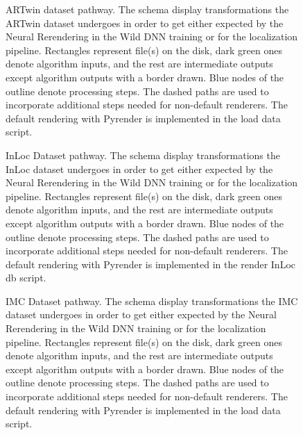 \begin{figure}
    \centering
    
    \caption{ARTwin dataset pathway. The
    schema display transformations the ARTwin dataset undergoes in order to get either
     expected by the Neural Rerendering in the Wild DNN training or
     for the localization pipeline. Rectangles represent file(s) on the disk,
    dark green ones denote algorithm inputs, and the rest are intermediate outputs except
    algorithm outputs with a border drawn. Blue nodes of the outline denote processing
    steps. The dashed paths are used to incorporate additional steps needed for
    non-default renderers.  The default rendering with Pyrender is implemented in the load
    data script.}
    \label{fig:artwin_dset_pathway}
\end{figure}

\begin{figure}
    \centering
    
    \caption{InLoc Dataset pathway. The
    schema display transformations the InLoc dataset undergoes in order to get either
     expected by the Neural Rerendering in the Wild DNN training or
     for the localization pipeline. Rectangles represent file(s) on the disk,
    dark green ones denote algorithm inputs, and the rest are intermediate outputs except
    algorithm outputs with a border drawn. Blue nodes of the outline denote processing
    steps. The dashed paths are used to incorporate additional steps needed for
    non-default renderers.  The default rendering with Pyrender is implemented in the
    render InLoc db script.}
    \label{fig:inloc_dset_pathway}
\end{figure}

\begin{figure}
    \centering
    
    \caption{IMC Dataset pathway. The schema
    display transformations the IMC dataset undergoes in order to get either  expected by the Neural Rerendering in the Wild DNN training or 
    for the localization pipeline. Rectangles represent file(s) on the disk, dark green
    ones denote algorithm inputs, and the rest are intermediate outputs except algorithm
    outputs with a border drawn. Blue nodes of the outline denote processing steps. The
    dashed paths are used to incorporate additional steps needed for non-default
    renderers.  The default rendering with Pyrender is implemented in the load data
    script.}
    \label{fig:imc_dset_pathway}
\end{figure}

